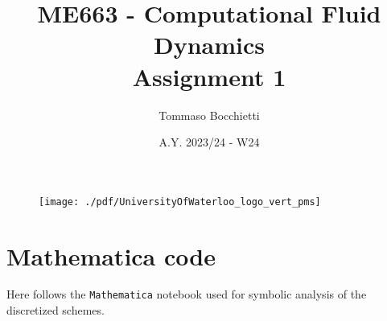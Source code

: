 \documentclass{assignment}
\begin{document}
\graphicspath{{./img/}}


\title{ME663 - Computational Fluid Dynamics \\ Assignment 1}
\author{Tommaso Bocchietti}
\date{A.Y. 2023/24 - W24}

\maketitle

\begin{figure}[H]
    \centering
    \texttt{[image: ./pdf/UniversityOfWaterloo\_logo\_vert\_pms]}
    \label{fig:University_Of_Waterloo_logo}
\end{figure}

\clearpage
\tableofcontents
\listoffigures
\listoftables
\lstlistoflistings
\printglossary[type=\acronymtype]

\clearpage






% 

\clearpage



\clearpage
\appendix
\section{Mathematica code}
\label{sec:appendix}

Here follows the \texttt{Mathematica} notebook used for symbolic analysis of the discretized schemes.


\end{document}
